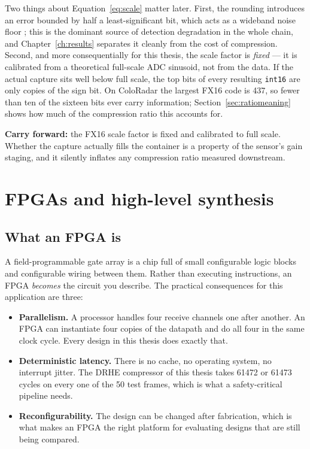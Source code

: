 Two things about Equation~\eqref{eq:scale} matter later. First, the rounding
introduces an error bounded by half a least-significant bit, which acts as a
wideband noise floor \cite{widrow2008}; this is the dominant source of
detection degradation in the whole chain, and Chapter~\ref{ch:results}
separates it cleanly from the cost of compression. Second, and more
consequentially for this thesis, the scale factor is \emph{fixed} --- it is
calibrated from a theoretical full-scale ADC sinusoid, not from the data.
If the actual capture sits well below full scale, the top bits of every
resulting \texttt{int16} are only copies of the sign bit. On ColoRadar the largest FX16
code is \num{437}, so fewer than ten of the sixteen bits ever carry
information; Section~\ref{sec:ratiomeaning} shows how much of the compression
ratio this accounts for.

\begin{keybox}
\textbf{Carry forward:} the FX16 scale factor is fixed and calibrated to
full scale. Whether the capture actually fills the container is a property of
the sensor's gain staging, and it silently inflates any compression ratio
measured downstream.
\end{keybox}

\section{FPGAs and high-level synthesis}
\label{sec:fpga}

\subsection{What an FPGA is}

A field-programmable gate array is a chip full of small configurable logic
blocks and configurable wiring between them. Rather than executing
instructions, an FPGA \emph{becomes} the circuit you describe. The practical
consequences for this application are three:

\begin{itemize}
\item \textbf{Parallelism.} A processor handles four receive channels one after
another. An FPGA can instantiate four copies of the datapath and do all four in
the same clock cycle. Every design in this thesis does exactly that.
\item \textbf{Deterministic latency.} There is no cache, no operating system,
no interrupt jitter. The DRHE compressor of this thesis takes \num{61472} or
\num{61473} cycles on every one of the 50 test frames, which is what a
safety-critical pipeline needs.
\item \textbf{Reconfigurability.} The design can be changed after fabrication,
which is what makes an FPGA the right platform for evaluating designs that are
still being compared.
\end{itemize}

